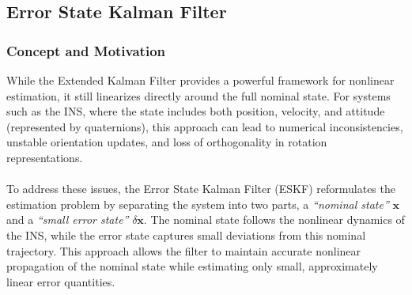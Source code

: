 \subsection{Error State Kalman Filter}
\subsubsection{Concept and Motivation}
While the Extended Kalman Filter provides a powerful framework for nonlinear estimation, it still linearizes directly around the full nominal state. For systems such as the INS, where the state includes both position, velocity, and attitude (represented by quaternions), this approach can lead to numerical inconsistencies, unstable orientation updates, and loss of orthogonality in rotation representations.  
\\ \\
To address these issues, the Error State Kalman Filter (ESKF) reformulates the estimation problem by separating the system into two parts, a \textit{``nominal state''} $\mathbf{x}$ and a \textit{``small error state''} $\delta\mathbf{x}$. The nominal state follows the nonlinear dynamics of the INS, while the error state captures small deviations from this nominal trajectory. This approach allows the filter to maintain accurate nonlinear propagation of the nominal state while estimating only small, approximately linear error quantities. 



